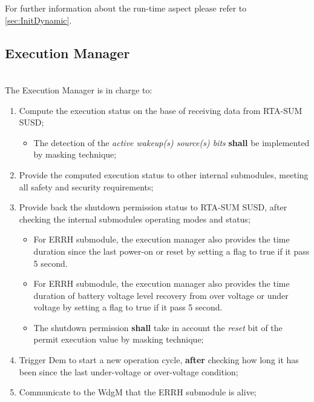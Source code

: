 For further information about the run-time aspect please refer to \ref{sec:InitDynamic}.

\subsection{Execution Manager}
\label{subsec:ExecManagerStatic}

\\
The Execution Manager is in charge to:

\begin{enumerate}
    \item Compute the execution status on the base of receiving data from RTA-SUM SUSD;
    \begin{itemize}
        \item The detection of the \textit{active wakeup(s) source(s) bits} \textbf{shall} be implemented by masking technique; 
    \end{itemize}
    \item Provide the computed execution status to other internal submodules, meeting all safety and security requirements;
    \item Provide back the shutdown permission status to RTA-SUM SUSD, after checking the internal submodules operating modes and status;
    \begin{itemize} 
        \item For ERRH submodule, the execution manager also provides the time duration since the last power-on or reset by setting a flag to true if it pass 5 second.
		\item For ERRH submodule, the execution manager also provides the time duration of battery voltage level recovery from over voltage or under voltage by setting a flag to true if it pass 5 second.
        \item The shutdown permission \textbf{shall} take in account the \textit{reset} bit of the permit execution value by masking technique;
    \end{itemize}
    \item Trigger Dem to start a new operation cycle, \textbf{after} checking how long it has been since the last under-voltage or over-voltage condition;
    \item Communicate to the WdgM that the ERRH submodule is alive;
\end{enumerate}

{            }

